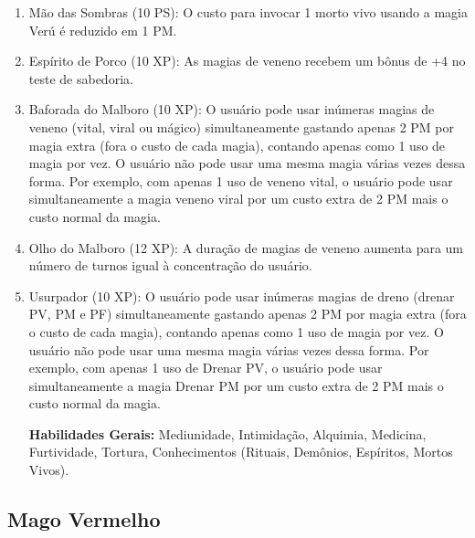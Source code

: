 \begin{enumerate}
	\item Mão das Sombras (10 PS): O custo para invocar 1 morto vivo usando a magia Verú é reduzido em 1 PM.
 

\item Espírito de Porco (10 XP): As magias de veneno recebem um bônus de +4 no teste de sabedoria. 

  	\item Baforada do Malboro (10 XP): O usuário pode usar inúmeras magias de veneno (vital, viral ou mágico) simultaneamente gastando apenas 2 PM por magia extra (fora o custo de cada magia), contando apenas como 1 uso de magia por vez. O usuário não pode usar uma mesma magia várias vezes dessa forma. Por exemplo, com apenas 1 uso de veneno vital, o usuário pode usar simultaneamente a magia veneno viral por um custo extra de 2 PM mais o custo normal da magia.

  	\item Olho do Malboro (12 XP): A duração de magias de veneno aumenta para um número de turnos igual à concentração do usuário.

		\item Usurpador (10 XP): O usuário pode usar inúmeras magias de dreno (drenar PV, PM e PF) simultaneamente gastando apenas 2 PM por magia extra (fora o custo de cada magia), contando apenas como 1 uso de magia por vez. O usuário não pode usar uma mesma magia várias vezes dessa forma. Por exemplo, com apenas 1 uso de Drenar PV, o usuário pode usar simultaneamente a magia Drenar PM por um custo extra de 2 PM mais o custo normal da magia.

  
\textbf{Habilidades Gerais:} Mediunidade, Intimidação, Alquimia, Medicina, Furtividade, Tortura, Conhecimentos (Rituais, Demônios, Espíritos, Mortos Vivos).
\end{enumerate}
  
  \subsection{Mago Vermelho}    
  	
